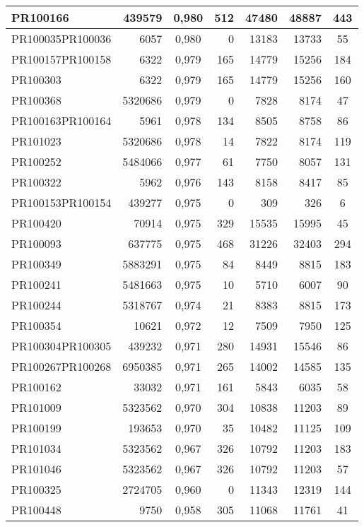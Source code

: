 \begin{center}
\begin{longtable}{lr|c|rrr|c}
	PR100166 & 439579 & 0,980 & 512 & 47480 & 48887 & 443 \\ \hline
	PR100035PR100036 & 6057 & 0,980 & 0 & 13183 & 13733 & 55 \\ \hline
	PR100157PR100158 & 6322 & 0,979 & 165 & 14779 & 15256 & 184 \\ \hline
	PR100303 & 6322 & 0,979 & 165 & 14779 & 15256 & 160 \\ \hline
	PR100368 & 5320686 & 0,979 & 0 & 7828 & 8174 & 47 \\ \hline
	PR100163PR100164 & 5961 & 0,978 & 134 & 8505 & 8758 & 86 \\ \hline
	PR101023 & 5320686 & 0,978 & 14 & 7822 & 8174 & 119 \\ \hline
	PR100252 & 5484066 & 0,977 & 61 & 7750 & 8057 & 131 \\ \hline
	PR100322 & 5962 & 0,976 & 143 & 8158 & 8417 & 85 \\ \hline
	PR100153PR100154 & 439277 & 0,975 & 0 & 309 & 326 & 6 \\ \hline
	PR100420 & 70914 & 0,975 & 329 & 15535 & 15995 & 45 \\ \hline
	PR100093 & 637775 & 0,975 & 468 & 31226 & 32403 & 294 \\ \hline
	PR100349 & 5883291 & 0,975 & 84 & 8449 & 8815 & 183 \\ \hline
	PR100241 & 5481663 & 0,975 & 10 & 5710 & 6007 & 90 \\ \hline
	PR100244 & 5318767 & 0,974 & 21 & 8383 & 8815 & 173 \\ \hline
	PR100354 & 10621 & 0,972 & 12 & 7509 & 7950 & 125 \\ \hline
	PR100304PR100305 & 439232 & 0,971 & 280 & 14931 & 15546 & 86 \\ \hline
	PR100267PR100268 & 6950385 & 0,971 & 265 & 14002 & 14585 & 135 \\ \hline
	PR100162 & 33032 & 0,971 & 161 & 5843 & 6035 & 58 \\ \hline
	PR101009 & 5323562 & 0,970 & 304 & 10838 & 11203 & 89 \\ \hline
	PR100199 & 193653 & 0,970 & 35 & 10482 & 11125 & 109 \\ \hline
	PR101034 & 5323562 & 0,967 & 326 & 10792 & 11203 & 183 \\ \hline
	PR101046 & 5323562 & 0,967 & 326 & 10792 & 11203 & 57 \\ \hline
	PR100325 & 2724705 & 0,960 & 0 & 11343 & 12319 & 144 \\ \hline
	PR100448 & 9750 & 0,958 & 305 & 11068 & 11761 & 41 \\ \hline

\end{longtable}
\end{center}
